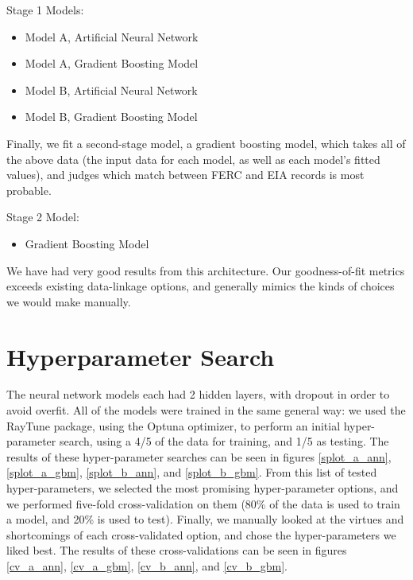 \documentclass{article}
\begin{document}
Stage 1 Models:
\begin{itemize}
\item Model A, Artificial Neural Network
\item Model A, Gradient Boosting Model
\item Model B, Artificial Neural Network
\item Model B, Gradient Boosting Model
\end{itemize}

Finally, we fit a second-stage model, a gradient boosting model, which takes all of the above data (the input data for each model, as well as each model’s fitted values), and judges which match between FERC and EIA records is most probable.

Stage 2 Model:
\begin{itemize}
\item Gradient Boosting Model
\end{itemize}

We have had very good results from this architecture.
Our goodness-of-fit metrics exceeds existing data-linkage options, and generally mimics the kinds of choices we would make manually.

\section{Hyperparameter Search}

The neural network models each had 2 hidden layers, with dropout in order to avoid overfit.
All of the models were trained in the same general way: we used the RayTune package, using the Optuna optimizer, to perform an initial hyper-parameter search, using a 4/5 of the data for training, and 1/5 as testing. 
The results of these hyper-parameter searches can be seen in figures \ref{splot_a_ann}, \ref{splot_a_gbm}, \ref{splot_b_ann}, and \ref{splot_b_gbm}.
From this list of tested hyper-parameters, we selected the most promising hyper-parameter options, and we performed five-fold cross-validation on them (80\% of the data is used to train a model, and 20\% is used to test). 
Finally, we manually looked at the virtues and shortcomings of each cross-validated option, and chose the hyper-parameters we liked best.
The results of these cross-validations can be seen in figures \ref{cv_a_ann}, \ref{cv_a_gbm}, \ref{cv_b_ann}, and \ref{cv_b_gbm}.

\end{document}
